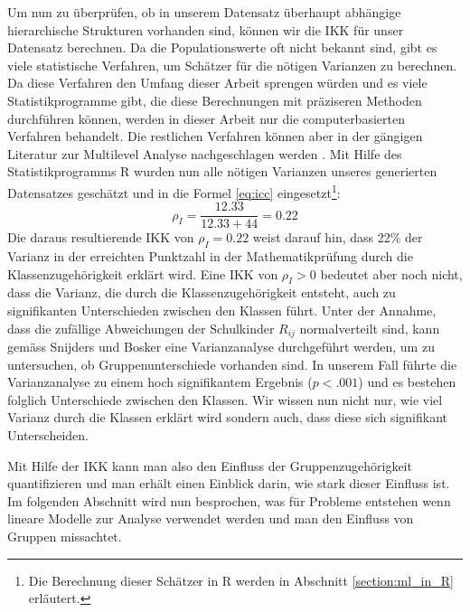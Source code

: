 \documentclass[12pt]{article}\usepackage[]{graphicx}\usepackage[]{color}
\begin{document}
Um nun zu überprüfen, ob in unserem Datensatz überhaupt abhängige hierarchische Strukturen vorhanden sind, können wir die IKK für unser Datensatz berechnen. Da die Populationswerte oft nicht bekannt sind, gibt es viele statistische Verfahren, um Schätzer für die nötigen Varianzen zu berechnen. Da diese Verfahren den Umfang dieser Arbeit sprengen würden und es viele Statistikprogramme gibt, die diese Berechnungen mit präziseren Methoden durchführen können, werden in dieser Arbeit nur die computerbasierten Verfahren behandelt. Die restlichen Verfahren können aber in der gängigen Literatur zur Multilevel Analyse nachgeschlagen werden \citep[z.B.][]{SnijdersTomA.B2012Ma:a}. Mit Hilfe des Statistikprogramms R wurden nun alle nötigen Varianzen unseres generierten Datensatzes geschätzt und in die Formel \eqref{eq:icc} eingesetzt\footnote{Die Berechnung dieser Schätzer in R werden in Abschnitt \ref{section:ml_in_R} erläutert.}:
\begin{equation} \label{eq:icc_calc}
\rho_{I} = \dfrac{12.33}{12.33 + 44} = 0.22
\end{equation}
Die daraus resultierende IKK von $\rho_{I} = 0.22$ weist darauf hin, dass 22\% der Varianz in der erreichten Punktzahl in der Mathematikprüfung durch die Klassenzugehörigkeit erklärt wird. Eine IKK von $\rho_{I} > 0$ bedeutet aber noch nicht, dass die Varianz, die durch die Klassenzugehörigkeit entsteht, auch zu signifikanten Unterschieden zwischen den Klassen führt. Unter der Annahme, dass die zufällige Abweichungen der Schulkinder $R_{ij}$ normalverteilt sind, kann gemäss Snijders und Bosker \citeyearpar{SnijdersTomA.B2012Ma:a} eine Varianzanalyse durchgeführt werden, um zu untersuchen, ob Gruppenunterschiede vorhanden sind. In unserem Fall führte die Varianzanalyse zu einem hoch signifikantem Ergebnis ($p<.001$) und es bestehen folglich Unterschiede zwischen den Klassen. Wir wissen nun nicht nur, wie viel Varianz durch die Klassen erklärt wird sondern auch, dass diese sich signifikant Unterscheiden. 

Mit Hilfe der IKK kann man also den Einfluss der Gruppenzugehörigkeit quantifizieren und man erhält einen Einblick darin, wie stark dieser Einfluss ist. Im folgenden Abschnitt wird nun besprochen, was für Probleme entstehen wenn lineare Modelle zur Analyse verwendet werden und man den Einfluss von Gruppen missachtet.
\end{document}
